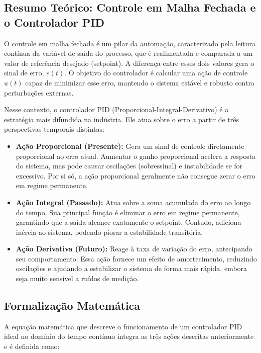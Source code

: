 \documentclass[12pt]{article}
\begin{document}
\subsection{Resumo Teórico: Controle em Malha Fechada e o Controlador PID}

O controle em malha fechada é um pilar da automação, caracterizado pela leitura contínua da variável de saída do processo, que é realimentada e comparada a um valor de referência desejado (setpoint). A diferença entre esses dois valores gera o sinal de erro, $e(t)$. O objetivo do controlador é calcular uma ação de controle $u(t)$ capaz de minimizar esse erro, mantendo o sistema estável e robusto contra perturbações externas.

Nesse contexto, o controlador PID (Proporcional-Integral-Derivativo) é a estratégia mais difundida na indústria. Ele atua sobre o erro a partir de três perspectivas temporais distintas:

\begin{itemize}
    \item \textbf{Ação Proporcional (Presente):} Gera um sinal de controle diretamente proporcional ao erro atual. Aumentar o ganho proporcional acelera a resposta do sistema, mas pode causar oscilações (sobressinal) e instabilidade se for excessivo. Por si só, a ação proporcional geralmente não consegue zerar o erro em regime permanente.
    \item \textbf{Ação Integral (Passado):} Atua sobre a soma acumulada do erro ao longo do tempo. Sua principal função é eliminar o erro em regime permanente, garantindo que a saída alcance exatamente o setpoint. Contudo, adiciona inércia ao sistema, podendo piorar a estabilidade transitória.
    \item \textbf{Ação Derivativa (Futuro):} Reage à taxa de variação do erro, antecipando seu comportamento. Essa ação fornece um efeito de amortecimento, reduzindo oscilações e ajudando a estabilizar o sistema de forma mais rápida, embora seja muito sensível a ruídos de medição.
\end{itemize}

\subsection{Formalização Matemática}

A equação matemática que descreve o funcionamento de um controlador PID ideal no domínio do tempo contínuo integra as três ações descritas anteriormente e é definida como:
\end{document}

